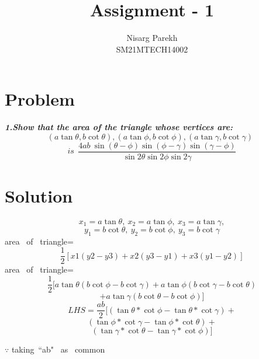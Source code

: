 \documentclass[journal,12pt,twocolumn]{IEEEtran}
\begin{document}
\providecommand{\sbrak}[1]{\ensuremath{{}\left[#1\right]}}
\providecommand{\lsbrak}[1]{\ensuremath{{}\left[#1\right.}}
\providecommand{\rsbrak}[1]{\ensuremath{{}\left.#1\right]}}
\providecommand{\brak}[1]{\ensuremath{\left(#1\right)}}
\providecommand{\lbrak}[1]{\ensuremath{\left(#1\right.}}
\providecommand{\rbrak}[1]{\ensuremath{\left.#1\right)}}
\providecommand{\cbrak}[1]{\ensuremath{\left\{#1\right\}}}
\providecommand{\lcbrak}[1]{\ensuremath{\left\{#1\right.}}
\providecommand{\rcbrak}[1]{\ensuremath{\left.#1\right\}}}
\newcommand{\myvec}[1]{\ensuremath{\begin{pmatrix}#1\end{pmatrix}}}
\newcommand{\cmyvec}[1]{\ensuremath{\begin{pmatrix*}[c]#1\end{pmatrix*}}}
\newcommand{\mydet}[1]{\ensuremath{\begin{vmatrix}#1\end{vmatrix}}}
\newcommand{\proj}[2]{\textbf{proj}_{\vec{#1}}\vec{#2}}
\let\StandardTheFigure\thefigure
\let\vec\mathbf

\title{
Assignment - 1
}
\author{ Nisarg Parekh \\SM21MTECH14002}
\maketitle
\newpage
\bigskip

\section*{\textbf{Problem}}
\noindent
\textbf{\textsl{1.Show that the area of the triangle whose vertices are:
$$(a \tan\theta, b\cot\theta),(a \tan \phi, b\cot \phi),(a \tan \gamma, b\cot \gamma)~~$$
$$ is~~  \frac{4ab~\sin(\theta-\phi)\sin(\phi-\gamma)\sin(\gamma-\phi)}{\sin2\theta\sin2\phi\sin2\gamma}$$ }}



\noindent
\section*{\textbf{Solution}}
\noindent
$$ x_1=a\tan\theta,~x_2=a\tan\phi,~x_3=a\tan\gamma,$$
$$y_1=b\cot\theta,~y_2=b\cot\phi,~y_3=b\cot\gamma$$ area~ of ~triangle=
$$\frac{1}{2}[x1(y2-y3)+x2(y3-y1)+x3(y1-y2)]$$
\vspace{0.2cm}
 area~ of ~triangle=$$\frac{1}{2}[a\tan\theta(b\cot\phi-b\cot\gamma)+a\tan\phi(b\cot\gamma-b\cot\theta)$$$$+a\tan\gamma(b\cot\theta-b\cot\phi)]$$
\vspace{0.2cm}
$$ LHS = \frac{ab}{2}[\left(\tan\theta*\cot\phi -\tan\theta*\cot\gamma\right)+$$$$ \left(\tan\phi*\cot\gamma -\tan\phi*\cot\theta\right) + $$$$\left(\tan\gamma*\cot\theta -\tan\gamma*\cot\phi\right)]$$ 
\begin{flushright}
$ \because$ taking~``ab" ~as ~common
\end{flushright}
\end{document}
